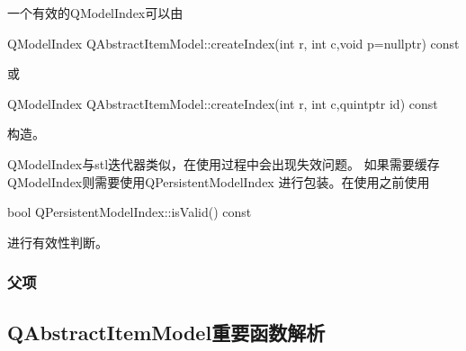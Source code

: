 一个有效的QModelIndex可以由\begin{littlelongworld}
QModelIndex QAbstractItemModel::createIndex(int r, int c,void \raisebox{-0.35ex}{\sourcefonttwo{}*}p{\sourcefonttwo{}=}nullptr) const
\end{littlelongworld}
或\begin{littlelongworld}
QModelIndex QAbstractItemModel::createIndex(int r, int c,quintptr id) const
\end{littlelongworld}
构造。

QModelIndex与stl迭代器类似，在使用过程中会出现失效问题。
如果需要缓存QModelIndex则需要使用QPersistentModelIndex
进行包装。在使用之前使用\begin{littlelongworld}
bool QPersistentModelIndex::isValid() const
\end{littlelongworld}
进行有效性判断。


\FloatBarrier
\subsubsection{
父项
}\label{c000019s01s03s03}


\FloatBarrier
\subsection{
QAbstractItemModel重要函数解析
}\label{c000019s01s02}

